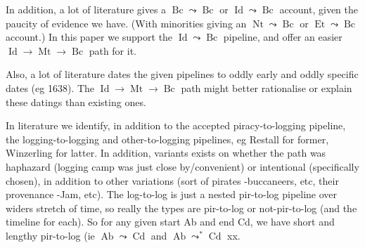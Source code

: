\documentclass{amsart}
\DeclareMathOperator{\id}{Id}%
\DeclareMathOperator{\mt}{Mt}%
\DeclareMathOperator{\bc}{Bc}%
\DeclareMathOperator{\et}{Et}%
\DeclareMathOperator{\nt}{Nt}%
\DeclareMathOperator{\ab}{Ab}%
\DeclareMathOperator{\cd}{Cd}%
\theoremstyle{definition}%
\theoremstyle{definition}%
\theoremstyle{remark}%
\begin{document}
In addition, a lot of literature gives a \(\bc\leadsto\bc\) or \(\id\leadsto\bc\) account, given the paucity of evidence we have. (With minorities giving an \(\nt\leadsto\bc\) or \(\et\leadsto\bc\) account.) In this paper we support the \(\id\leadsto\bc\) pipeline, and offer an easier \(\id\to\mt\to\bc\) path for it.

Also, a lot of literature dates the given pipelines to oddly early and oddly specific dates (eg 1638). The \(\id\to\mt\to\bc\) path might better rationalise or explain these datings than existing ones.

In literature we identify, in addition to the accepted piracy-to-logging pipeline, the logging-to-logging and other-to-logging pipelines, eg Restall for former, Winzerling for latter. In addition, variants exists on whether the path was haphazard (logging camp was just close by/convenient) or intentional (specifically chosen), in addition to other variations (sort of pirates -buccaneers, etc, their provenance -Jam, etc). The log-to-log is just a nested pir-to-log pipeline over widers stretch of time, so really the types are pir-to-log or not-pir-to-log (and the timeline for each). So for any given start Ab and end Cd, we have short and lengthy pir-to-log (ie \(\ab\leadsto\cd\) and \(\ab\leadsto^{*}\cd\) xx.
%
%
%
%
\end{document}
